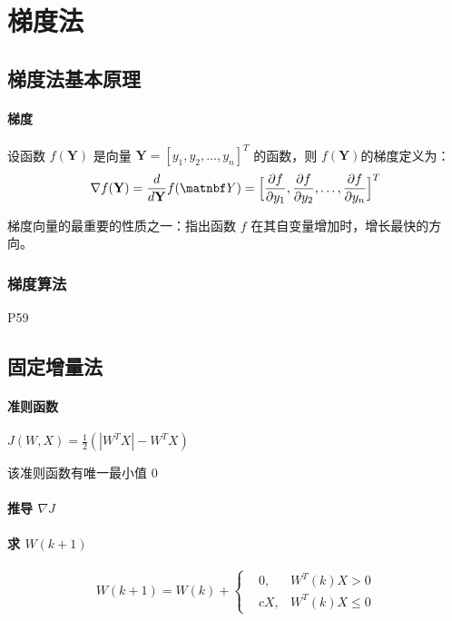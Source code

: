 \documentclass[11pt]{book}
\begin{document}
\section{梯度法}

\subsection{梯度法基本原理}

\paragraph{梯度}%
\label{par:ti_du_}

设函数 $f(\mathbf{Y})$ 是向量 $\mathbf{Y} = [y_1, y_2, \ldots, y_n]^T$ 的函数，则 $f(\mathbf Y)$的梯度定义为：
$$
\nabla f(\mathbf Y) = \frac{d}{d \mathbf Y} f(\matnbf Y) = \Big[ \frac{\partial f}{\partial y_1} , \frac{\partial f}{\partial y_2} , \ldots, \frac{\partial f}{\partial y_n} \Big]^T
$$

梯度向量的最重要的性质之一：指出函数 $f$ 在其自变量增加时，增长最快的方向。

\subsubsection{梯度算法}%
\label{ssub:ti_du_suan_fa_}

P59

\subsection{固定增量法}

\paragraph{准则函数}%
\label{par:zhun_ze_han_shu_}

$J(W, X) = \frac{1}{2}(|W^T X| - W^T X)$

该准则函数有唯一最小值 $0$

\paragraph{推导 $\nabla J$}%
\label{par:tui_dao_nabla_j_}

\paragraph{求 $W(k+1)$}%
\label{par:qiu_w_k_1_}

$$
W(k+1) = W(k) + 
\left\{
\begin{aligned}
	& 0, &W^T(k) X > 0 \\
	& cX, & W^T(k) X \leq 0
\end{aligned}
\right.
$$
\end{document}
